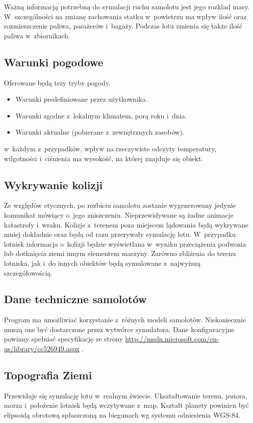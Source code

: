 \documentclass{mwrep}
\begin{document}
\vspace*{\baselineskip}
Ważną informacją potrzebną do symulacji ruchu samolotu jest jego rozkład masy. W~szczególności na zmianę zachowania statku w~powietrzu ma wpływ ilość oraz rozmieszczenie paliwa, pasażerów i~bagaży. Podczas lotu zmienia się także ilość paliwa w~zbiornikach.

\subsection{Warunki pogodowe}
Oferowane będą trzy tryby pogody.

\begin{itemize}
\item Warunki predefiniowane przez użytkownika.
\item Warunki zgodne z~lokalnym klimatem, porą roku i~dnia.
\item Warunki aktualne (pobierane z~zewnętrznych zasobów).
\end{itemize}

\noindent w~każdym z~przypadków, wpływ na rzeczywiste odczyty temperatury, wilgotności i~ciśnienia ma wysokość, na której znajduje się obiekt.


\subsection{Wykrywanie kolizji}
Ze względów etycznych, po rozbiciu samolotu zostanie wygenerowany jedynie komunikat mówiący o~jego zniszczeniu. Nieprzewidywane są żadne animacje katastrofy i~wraku. Kolizje z~terenem poza miejscem lądowania będą wykrywane mniej dokładnie oraz będą od razu przerywały symulację lotu. W~przypadku lotnisk informacja o~kolizji będzie wyświetlana w~wyniku przeciążenia podwozia lub dotknięcia ziemi innym elementem maszyny. Zarówno zbliżenia do terenu lotniska, jak i~do innych obiektów będą symulowane z~najwyższą szczegółowością.

\subsection{Dane techniczne samolotów}
Program ma umożliwiać korzystanie z~różnych modeli samolotów. Niekoniecznie muszą one być dostarczone przez wytwórce symulatora. Dane konfiguracyjne powinny spełniać specyfikację ze strony \linebreak \url{http://msdn.microsoft.com/en-us/library/cc526949.aspx} .

\subsection{Topografia Ziemi}
Przewiduje się symulację lotu w~realnym świecie. Ukształtowanie terenu, jeziora, morza i~położenie lotnisk będą wczytywane z~map. Kształt planety powinien być elipsoidą obrotową spłaszczoną na biegunach wg systemu odniesienia WGS-84.
\end{document}
